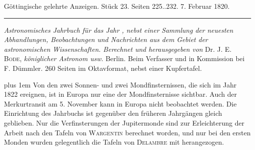 \clearpage
{}
\hypertarget{native-624-lower}{}
\begin{center}\small Göttingische gelehrte Anzeigen. Stück 23. Seiten 225..232. 7. Februar 1820.\\[3pt]\rule{.72\linewidth}{.3pt}\end{center}

\emph{Astronomisches Jahrbuch für das Jahr {}, nebst einer Sammlung der neuesten Abhandlungen, Beobachtungen und Nachrichten aus dem Gebiet der astronomischen Wissenschaften. Berechnet und herausgegeben von} Dr. J. E. \textsc{Bode}, \emph{königlicher Astronom usw.} Berlin. Beim Verfasser und in Kommission bei F. Dümmler. 260 Seiten im Oktavformat, nebst einer Kupfertafel.

\begingroup\rightskip=0pt plus 1em
Von den zwei Sonnen- und zwei Mondfinsternissen, die sich im Jahr 1822 ereignen, ist in Europa nur eine der Mondfinsternisse sichtbar. Auch der Merkurtransit am 5. November kann in Europa nicht beobachtet werden. Die Einrichtung des Jahrbuchs ist gegenüber den früheren Jahrgängen gleich geblieben. Nur die Verfinsterungen der Jupitermonde sind zur Erleichterung der Arbeit nach den Tafeln von \textsc{Wargentin} berechnet worden, und nur bei den ersten Monden wurden gelegentlich die Tafeln von \textsc{Delambre} mit herangezogen.\par\endgroup

